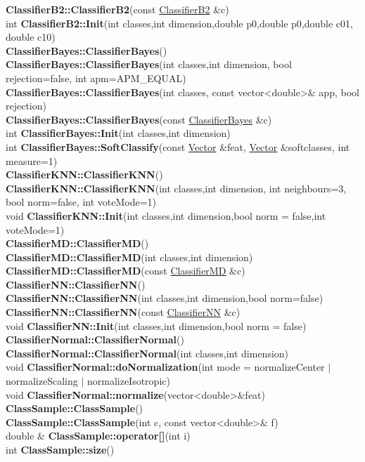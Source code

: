 \documentclass[10pt,titlepage]{article}
\def\functionlistentry#1#2#3#4#5#6{\noindent #1 {\bf #2}(#3) \dotfill #6\\}
\begin{document}
{{\functionlistentry{}{ClassifierB2::ClassifierB2}{const \hyperlink{ClassifierB2}{ClassifierB2} \&c}{980}{classification}{}
\functionlistentry{int}{ClassifierB2::Init}{int classes,int dimension,double p0,double p0,double c01, double c10}{981}{classification}{}
\functionlistentry{}{ClassifierBayes::ClassifierBayes}{}{982}{classification}{}
\functionlistentry{}{ClassifierBayes::ClassifierBayes}{int classes,int dimension, bool rejection=false, int apm=APM\_EQUAL}{983}{classification}{}
\functionlistentry{}{ClassifierBayes::ClassifierBayes}{int classes, const vector\textless {}double\textgreater  \& app, bool rejection}{984}{classification}{}
\functionlistentry{}{ClassifierBayes::ClassifierBayes}{const \hyperlink{ClassifierBayes}{ClassifierBayes} \&c}{985}{classification}{}
\functionlistentry{int}{ClassifierBayes::Init}{int classes,int dimension}{986}{classification}{}
\functionlistentry{int}{ClassifierBayes::SoftClassify}{const \hyperlink{Vector}{Vector} \&feat, \hyperlink{Vector}{Vector} \&softclasses, int measure=1}{987}{classification}{}
\functionlistentry{}{ClassifierKNN::ClassifierKNN}{}{975}{classification}{}
\functionlistentry{}{ClassifierKNN::ClassifierKNN}{int classes,int dimension, int neighbours=3, bool norm=false, int voteMode=1}{976}{classification}{}
\functionlistentry{void}{ClassifierKNN::Init}{int classes,int dimension,bool norm = false,int voteMode=1}{977}{classification}{}
\functionlistentry{}{ClassifierMD::ClassifierMD}{}{968}{classification}{}
\functionlistentry{}{ClassifierMD::ClassifierMD}{int classes,int dimension}{969}{classification}{}
\functionlistentry{}{ClassifierMD::ClassifierMD}{const \hyperlink{ClassifierMD}{ClassifierMD} \&c}{970}{classification}{}
\functionlistentry{}{ClassifierNN::ClassifierNN}{}{971}{classification}{}
\functionlistentry{}{ClassifierNN::ClassifierNN}{int classes,int dimension,bool norm=false}{972}{classification}{}
\functionlistentry{}{ClassifierNN::ClassifierNN}{const \hyperlink{ClassifierNN}{ClassifierNN} \&c}{973}{classification}{}
\functionlistentry{void}{ClassifierNN::Init}{int classes,int dimension,bool norm = false}{974}{classification}{}
\functionlistentry{}{ClassifierNormal::ClassifierNormal}{}{964}{classification}{}
\functionlistentry{}{ClassifierNormal::ClassifierNormal}{int classes,int dimension}{965}{classification}{}
\functionlistentry{void}{ClassifierNormal::doNormalization}{int mode = normalizeCenter $|$ normalizeScaling $|$ normalizeIsotropic}{966}{classification}{}
\functionlistentry{void}{ClassifierNormal::normalize}{vector\textless {}double\textgreater  \&feat}{967}{classification}{}
\functionlistentry{}{ClassSample::ClassSample}{}{938}{classification}{}
\functionlistentry{}{ClassSample::ClassSample}{int c, const vector\textless {}double\textgreater  \& f}{939}{classification}{}
\functionlistentry{double \&}{ClassSample::operator[]}{int i}{940}{classification}{}
\functionlistentry{int}{ClassSample::size}{}{941}{classification}{}

}}
\end{document}
